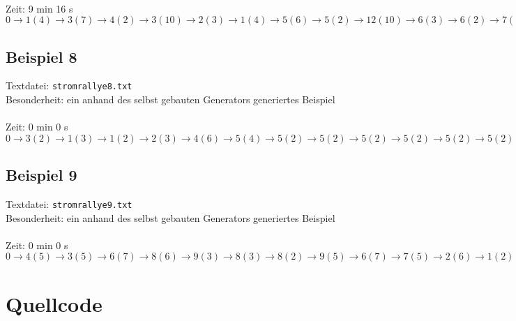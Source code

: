 \documentclass[a4paper,10pt,ngerman]{scrartcl}
\begin{document}
\noindent
{}\\

\noindent
Zeit: 9 min 16 s\\

\noindent
$0 \rightarrow 1(4) \rightarrow 3(7) \rightarrow 4(2) \rightarrow 3(10) \rightarrow 2(3) \rightarrow 1(4) \rightarrow 5(6) \rightarrow 5(2) 
\rightarrow 12(10) \rightarrow 6(3) \rightarrow 6(2) \rightarrow 7(2) \rightarrow 8(2) \rightarrow 9(2) \rightarrow 10(2) \rightarrow 11(2) 
\rightarrow 13(1) \rightarrow 14(1) \rightarrow 15(1) \rightarrow 16(1) \rightarrow 17(1) \rightarrow 18(1) \rightarrow 19(1) \rightarrow 20(3) 
\rightarrow 21(1) \rightarrow 22(1) \rightarrow 23(1) \rightarrow 24(1) \rightarrow 25(1) \rightarrow 28(1) \rightarrow 27(1) \rightarrow 26(1) 
\rightarrow 27(1) \rightarrow 30(1) \rightarrow 31(1) \rightarrow 30(1) \rightarrow 33(1) \rightarrow 34(1) \rightarrow 35(1) \rightarrow 32(1) 
\rightarrow 29(1) \rightarrow -1(1)$

\subsection{Beispiel 8}\label{example:8}
Textdatei: \texttt{stromrallye8.txt}\\
Besonderheit: ein anhand des selbst gebauten Generators generiertes Beispiel\\

\noindent
{}\\

\noindent
Zeit: 0 min 0 s\\

\noindent
$0 \rightarrow3(2) \rightarrow 1(3) \rightarrow 1(2) \rightarrow 2(3) \rightarrow 4(6) \rightarrow 5(4) \rightarrow 5(2) \rightarrow 5(2)
\rightarrow 5(2) \rightarrow 5(2) \rightarrow 5(2) \rightarrow 5(2) \rightarrow 5(2) \rightarrow 5(2)$

\subsection{Beispiel 9}\label{example:9}
Textdatei: \texttt{stromrallye9.txt}\\
Besonderheit: ein anhand des selbst gebauten Generators generiertes Beispiel\\

\noindent
{}\\

\noindent
Zeit: 0 min 0 s\\

\noindent
$0 \rightarrow 4(5) \rightarrow 3(5) \rightarrow 6(7) \rightarrow 8(6) \rightarrow 9(3) \rightarrow 8(3) \rightarrow 8(2) \rightarrow 9(5) 
\rightarrow 6(7) \rightarrow 7(5) \rightarrow 2(6) \rightarrow 1(2) \rightarrow 3(4) \rightarrow 5(1) \rightarrow 5(2) \rightarrow 4(4) 
\rightarrow -1(1)$


\newpage
\section{Quellcode}

\end{document}
